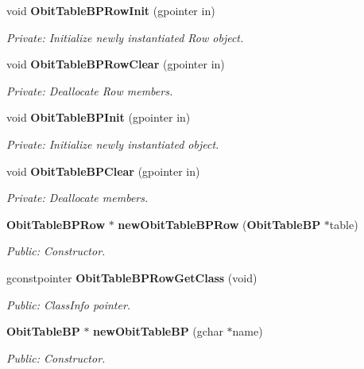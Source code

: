 \begin{CompactItemize}
\item 
void {\bf Obit\-Table\-BPRow\-Init} (gpointer in)
\begin{CompactList}\small\item\em Private: Initialize newly instantiated Row object. \item\end{CompactList}\item 
void {\bf Obit\-Table\-BPRow\-Clear} (gpointer in)
\begin{CompactList}\small\item\em Private: Deallocate Row members. \item\end{CompactList}\item 
void {\bf Obit\-Table\-BPInit} (gpointer in)
\begin{CompactList}\small\item\em Private: Initialize newly instantiated object. \item\end{CompactList}\item 
void {\bf Obit\-Table\-BPClear} (gpointer in)
\begin{CompactList}\small\item\em Private: Deallocate members. \item\end{CompactList}\item 
{\bf Obit\-Table\-BPRow} $\ast$ {\bf new\-Obit\-Table\-BPRow} ({\bf Obit\-Table\-BP} $\ast$table)
\begin{CompactList}\small\item\em Public: Constructor. \item\end{CompactList}\item 
gconstpointer {\bf Obit\-Table\-BPRow\-Get\-Class} (void)
\begin{CompactList}\small\item\em Public: Class\-Info pointer. \item\end{CompactList}\item 
{\bf Obit\-Table\-BP} $\ast$ {\bf new\-Obit\-Table\-BP} (gchar $\ast$name)
\begin{CompactList}\small\item\em Public: Constructor. \item\end{CompactList}\item 

\end{CompactItemize}
